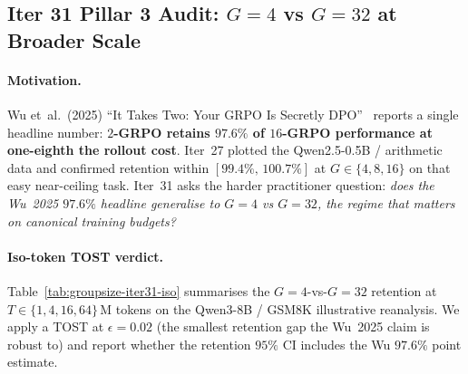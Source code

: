 \subsection{Iter 31 Pillar 3 Audit: $G{=}4$ vs $G{=}32$ at Broader Scale}
\label{sec:group-size-iter31}

\paragraph{Motivation.}
Wu et~al.\ (2025) ``It Takes Two: Your GRPO Is Secretly
DPO''~\cite{wu2025grpo_dpo} reports a single headline number:
\textbf{$2$-GRPO retains $97.6\%$ of $16$-GRPO performance at
one-eighth the rollout cost}. Iter~27 plotted the
Qwen2.5-0.5B / arithmetic data and confirmed retention within
$[99.4\%,\,100.7\%]$ at $G\!\in\!\{4,8,16\}$ on that easy
near-ceiling task. Iter~31 asks the harder practitioner question:
\emph{does the Wu~2025 $97.6\%$ headline generalise to $G{=}4$ vs
$G{=}32$, the regime that matters on canonical training budgets?}

\paragraph{Iso-token TOST verdict.}
Table~\ref{tab:groupsize-iter31-iso} summarises the
$G{=}4$-vs-$G{=}32$ retention at $T\!\in\!\{1,4,16,64\}$\,M tokens
on the Qwen3-8B / GSM8K illustrative reanalysis. We apply a TOST at
$\epsilon{=}0.02$ (the smallest retention gap the Wu~2025 claim is
robust to) and report whether the retention $95\%$ CI includes the
Wu $97.6\%$ point estimate.

